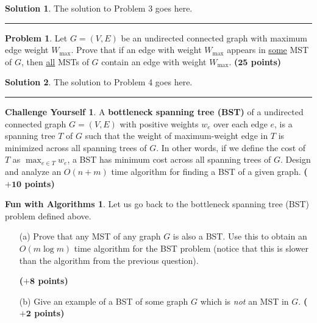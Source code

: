 \documentclass{article}
\theoremstyle{definition}
\newtheorem{problem}{Problem}
\newtheorem*{fun}{Fun with Algorithms}
\newtheorem*{challenge}{Challenge Yourself}
\def\fline{\rule{0.75\linewidth}{0.5pt}}
\newcommand{\finishline}{\begin{center}\fline\end{center}}
\newtheorem*{solution*}{Solution}
\newenvironment{solution}{\begin{solution*}}{{\finishline} \end{solution*}}
\newcommand{\grade}[1]{\hfill{\textbf{($\mathbf{#1}$ points)}}}
\begin{document}
\begin{solution}
The solution to Problem 3 goes here.
\end{solution}


\medskip


\begin{problem}
Let $G=(V,E)$ be an undirected connected graph with maximum edge weight $W_{\mathrm{max}}$. Prove that if an edge with weight $W_\mathrm{max}$ appears in \underline{some} MST of $G$, then \underline{all} MSTs of $G$ contain an edge
 with weight $W_{\mathrm{max}}$. \grade{25}
\end{problem}

\begin{solution}
The solution to Problem 4 goes here.
\end{solution}


\smallskip

\begin{challenge}
	A \textbf{bottleneck spanning tree (BST)} of a undirected connected graph $G=(V,E)$ with positive weights $w_e$ over each edge $e$, is a spanning tree $T$ of $G$ such that the weight of maximum-weight edge in $T$ is minimized 
	across all spanning trees of $G$. In other words, if we define the cost of $T$ as $\max_{e \in T} w_e$, a BST has minimum cost across all spanning trees of $G$. Design and analyze an $O(n+m)$ time algorithm for finding a BST of a given graph. 
	  \grade{+10}
\end{challenge}

\smallskip

\begin{fun}
	Let us go back to the bottleneck spanning tree (BST) problem defined above. 
	\begin{enumerate}
		\item[(a)] Prove that any MST of any graph $G$ is also a BST. Use this to obtain an $O(m\log{m})$ time algorithm for the BST problem (notice that this is  slower than the algorithm from the previous question). 
		
		\grade{+8}
		\item[(b)] Give an example of a BST of some graph $G$ which is \emph{not} an MST in $G$. \grade{+2}
	\end{enumerate}
 \end{fun}
\end{document}
